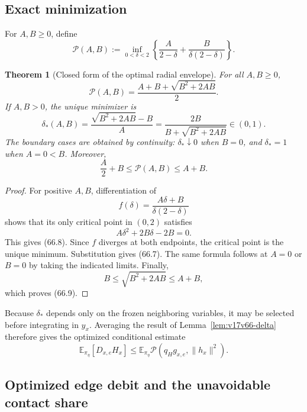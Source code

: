 \documentclass[11pt]{article}
\newtheorem{theorem}{Theorem}[section]
\theoremstyle{remark}
\begin{document}
\subsection{Exact minimization}

For \(A,B\geq0\), define
\[
 \mathcal P(A,B)
 :=\inf_{0<\delta<2}
 \left\{\frac{A}{2-\delta}
 +\frac{B}{\delta(2-\delta)}\right\}.             \tag{66.6}
\]

\begin{theorem}[Closed form of the optimal radial envelope]
\label{thm:v17v66-envelope}
For all \(A,B\geq0\),
\[
\boxed{
 \mathcal P(A,B)
 =\frac{A+B+\sqrt{B^2+2AB}}{2}.}                  \tag{66.7}
\]
If \(A,B>0\), the unique minimizer is
\[
 \delta_*(A,B)
 =\frac{\sqrt{B^2+2AB}-B}{A}
 =\frac{2B}{B+\sqrt{B^2+2AB}}\in(0,1).           \tag{66.8}
\]
The boundary cases are obtained by continuity: \(\delta_*\downarrow0\)
when \(B=0\), and \(\delta_*=1\) when \(A=0<B\).
Moreover,
\[
 \frac A2+B\leq\mathcal P(A,B)\leq A+B.          \tag{66.9}
\]
\end{theorem}

\begin{proof}
For positive \(A,B\), differentiation of
\[
 f(\delta)=\frac{A\delta+B}{\delta(2-\delta)}
\]
shows that its only critical point in \((0,2)\) satisfies
\[
 A\delta^2+2B\delta-2B=0.                         \tag{66.10}
\]
This gives (66.8).  Since \(f\) diverges at both endpoints, the
critical point is the unique minimum.  Substitution gives (66.7).
The same formula follows at \(A=0\) or \(B=0\) by taking the indicated
limits.  Finally,
\[
 B\leq\sqrt{B^2+2AB}\leq A+B,                    \tag{66.11}
\]
which proves (66.9).
\end{proof}

Because \(\delta_*\) depends only on the frozen neighboring variables,
it may be selected before integrating in \(y_x\).  Averaging the
result of Lemma~\ref{lem:v17v66-delta} therefore gives the optimized
conditional estimate
\[
\boxed{
 \mathbb E_{\pi_\eta}[D_{x,e}H_x]
 \leq
 \mathbb E_{\pi_\eta}
 \mathcal P(q_Hg_{x,e},\|h_x\|^2).}               \tag{66.12}
\]

\subsection{Optimized edge debit and the unavoidable contact share}
\end{document}
